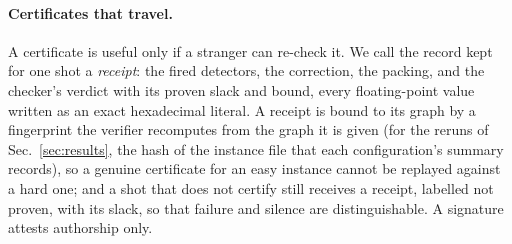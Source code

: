 \documentclass[aps,pra,twocolumn,superscriptaddress,nofootinbib,longbibliography,floatfix]{revtex4-2}
\begin{document}
\paragraph*{Certificates that travel.} A certificate is useful only if a stranger can re-check it. We call the record kept for one shot a \emph{receipt}: the fired detectors, the correction, the packing, and the checker's verdict with its proven slack and bound, every floating-point value written as an exact hexadecimal literal. A receipt is bound to its graph by a fingerprint the verifier recomputes from the graph it is given (for the reruns of Sec.~\ref{sec:results}, the hash of the instance file that each configuration's summary records), so a genuine certificate for an easy instance cannot be replayed against a hard one; and a shot that does not certify still receives a receipt, labelled not proven, with its slack, so that failure and silence are distinguishable. A signature attests authorship only.
\end{document}
